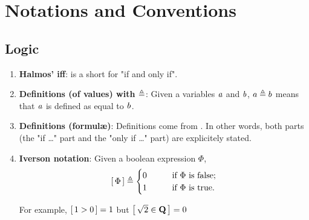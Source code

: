 \renewcommand{\labelenumi}{\arabic{enumi}.}
\chapter{Notations and Conventions}
\section{Logic}
\begin{enumerate}
\item{{\bf Halmos' iff}:  \iif is a short for "if and only if".}
\item{{\bf Definitions (of values) with $\triangleq$}: Given a variables %
$\mathit{a}$ and $\mathit{b}$, %
$a\triangleq b$ means that $\mathit{a}$ is defined as equal to $\mathit{b}$.}
\item{{\bf Definitions (formul\ae)}: Definitions come from \iif. %
In other words, both parts (the "if \dots" part and the "only if \dots" part) %
are explicitely stated. }
\item{{\bf Iverson notation}:  Given a boolean expression $\Phi$, 
%
  \begin{align}
    \left[\,\Phi\,\right]\triangleq
    \begin{cases}
      0 & \quad\quad \text{if } \Phi \text{ is false;} \\
      1 & \quad\quad \text{if } \Phi \text{ is true.}
    \end{cases}
  \end{align}

For example, $\left[\,1 > 0\,\right] = 1$ but $\left[\, \sqrt{2} \in {\mathbf Q}\,\right] = 0$
}
\end{enumerate}
